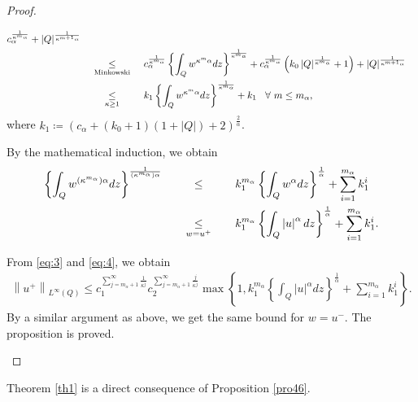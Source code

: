 \documentclass[11pt, a4paper]{article}
\numberwithin{equation}{section}
\newcommand{\coex}[2][\hphantom{longexplanation}]{%
  \underset{{#1}}{\overset{\hphantom{longexplanation}}{#2}}
}
\newcommand{\hk}{\hspace*{.12in}}
\newcommand{\abs}[1]{\left\lvert #1\right\rvert}
\newcommand{\norm}[1]{\left\lVert #1\right\rVert}
\begin{document}
\begin{proof}
\begin{description}[wide]
\begin{align*}
\begin{split}
      c_{\alpha}^{\frac{1}{\kappa^{m}\alpha}}+
      \abs{Q}^{\frac{1}{\kappa^{m+1}\alpha}}\\
    &\coex[\text{Minkowski}]{\le}
      c_{\alpha}^{\frac{1}{\kappa^{m}\alpha}}\left\{\int_{Q}w^{\kappa^{m}\alpha}dz\right\}^{\frac{1}{\kappa^{m}\alpha}}+
      c_{\alpha}^{\frac{1}{\kappa^{m}\alpha}} \left(k_{0}\abs{Q}^{\frac{1}{\kappa^{m}\alpha}}
      +1 \right)+ \abs{Q}^{\frac{1}{\kappa^{m+1}\alpha}}\\
    &\coex[\kappa\ge 1]{\le}
      k_{1}\left\{\int_{Q}w^{\kappa^{m}\alpha}dz\right\}^{\frac{1}{\kappa^{m}\alpha}}+k_{1}\hk\forall~m\le m_{\alpha}, 
  \end{split}
\end{align*}
where $k_{1}\coloneqq\left(c_{\alpha}+ (k_{0}+1)(1+\abs{Q})+2
\right)^{\frac{2}{\alpha}}$.

By the mathematical induction, we obtain
\begin{align}
\label{eq:4}
  \begin{split}
    \left\{\int_{Q}w ^{\left( \kappa^{m_{\alpha}} \right)\alpha}
    dz\right\}^{\frac{1}{\left( \kappa^{m_{\alpha}} \right)\alpha}}
    &\coex{\le}
  k_{1}^{m_{\alpha}}\left\{\int_{Q}w^{\alpha}dz\right\}^{\frac{1}{\alpha}}+
      \sum_{i=1}^{m_{\alpha}}k_{1}^{i}\\
    &\coex[w = u^{+}]{\le}
  k_{1}^{m_{\alpha}}\left\{\int_{Q}\abs{u}^{\alpha}dz\right\}^{\frac{1}{\alpha}}+
      \sum_{i=1}^{m_{\alpha}}k_{1}^{i}.
  \end{split}
\end{align}

From \eqref{eq:3} and \eqref{eq:4}, we obtain
\begin{align*}
\norm{u^{+}}_{L^{\infty}(Q)}
 \le c_{1}^{\sum_{j=m_{\alpha}+1}^{\infty}\frac{1}{\kappa^{j}}}c_{2}^{\sum_{j=m_{\alpha}+1}^{\infty}\frac{j}{\kappa^{j}}}\max\left\{1,k_{1}^{m_{\alpha}}\left\{\int_{Q}\abs{u}^{\alpha}dz\right\}^{\frac{1}{\alpha}}+
  \sum_{i=1}^{m_{\alpha}}k_{1}^{i}\right\}.
\end{align*}
By a similar argument as above, we get the same bound for
$w=u^{-}$. The proposition is proved.
\end{description}
\end{proof}

Theorem \ref{th1} is a direct consequence of Proposition \ref{pro46}.
\end{document}
